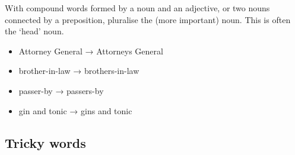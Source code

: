 \documentclass[11pt,a4paper]{book}
\newcommand{\cmark}{{\color{green(html/cssgreen)}\checkmark}}%
\begin{document}
				With compound words formed by a noun and an adjective, or two nouns connected by a preposition, pluralise the (more important) noun. This is often the `head' noun.
				{\firasans \begin{mdframed}[backgroundcolor=aliceblue] \begin{itemize}[label=\cmark]
					\item Attorney General → Attorneys General
					\item brother-in-law → brothers-in-law
					\item passer-by → passers-by
					\item gin and tonic → gins and tonic
				\end{itemize} \end{mdframed} }
			\newpage
				\subsection{Tricky words}
\end{document}
